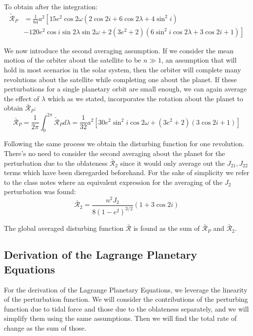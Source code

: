 To obtain after the integration:
\begin{equation}
\begin{aligned}
\tilde{\mathcal{R}}_P &= \frac{1}{64} a^2 \left[15 e^2 \cos 2 \omega  \left(2 \cos 2i + 6 \cos 2 \lambda +4 \sin^2 i \right) \right.\\
&\left. -120 e^2 \cos i \sin 2 \lambda \sin 2 \omega + 2 \left(3 e^2+2\right) \left(6 \sin^2 i \cos 2 \lambda +3 \cos 2i +1\right) \right]
\end{aligned}
\end{equation}

We now introduce the second averaging assumption. If we consider the mean motion of the orbiter about the satellite to be $n \gg 1$, an assumption that will hold in most scenarios in the solar system, then the orbiter will complete many revolutions about the satellite while completing one about the planet. If these perturbations for a single planetary orbit are small enough, we can again average the effect of $\lambda$ which as we stated, incorporates the rotation about the planet to obtain $\bar{\mathcal{R}}_P$:
\begin{equation}
\bar{\mathcal{R}}_P = \frac{1}{2\pi} \int_0^{2\pi} \tilde{\mathcal{R}}_P d\lambda = \frac{1}{32} a^2 \left[30 e^2 \sin^2 i \cos 2 \omega +\left(3 e^2+2\right) (3 \cos 2i +1)\right]
\end{equation}

Following the same process we obtain the disturbing function for one revolution. There's no need to consider the second averaging about the planet for the perturbation due to the oblateness $\bar{\mathcal{R}}_2$ since it would only average out the $J_{21}, J_{22}$ terms which have been disregarded beforehand. For the sake of simplicity we refer to the class notes where an equivalent expression for  the averaging of the $J_2$ perturbation was found:
\begin{equation}
\bar{\mathcal{R}}_2 = \frac{n^2 J_2}{8 (1-e^2)^{3/2}} \left(1 + 3 \cos 2i\right)
\end{equation}

The global averaged disturbing function $\bar{\mathcal{R}}$ is found as the sum of $\bar{\mathcal{R}}_P$ and $\bar{\mathcal{R}}_2$.

\subsection{Derivation of the Lagrange Planetary Equations}
For the derivation of the Lagrange Planetary Equations, we leverage the linearity of the perturbation function. We will consider the contributions of the perturbing function due to tidal force and those due to the oblateness separately, and we will simplify them using the same assumptions. Then we will find the total rate of change as the sum of those.

